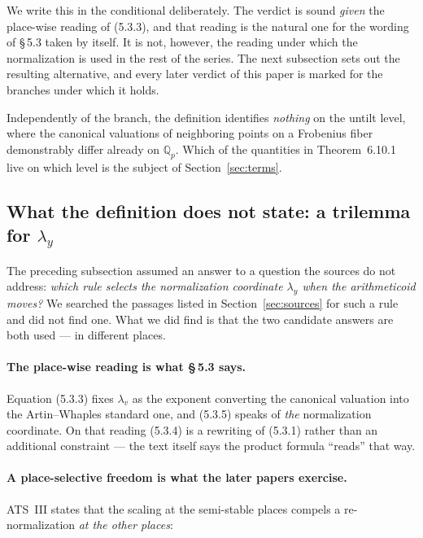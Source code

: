 \documentclass[11pt,a4paper]{article}
\theoremstyle{definition}
\theoremstyle{plain}
\theoremstyle{definition}
\begin{document}
We write this in the conditional deliberately. The verdict is sound \emph{given}
the place-wise reading of (5.3.3), and that reading is the natural one for the
wording of \S\,5.3 taken by itself. It is not, however, the reading under which
the normalization is used in the rest of the series. The next subsection sets out
the resulting alternative, and every later verdict of this paper is marked for the
branches under which it holds.

Independently of the branch, the definition identifies \emph{nothing} on the
untilt level, where the canonical valuations of neighboring points on a Frobenius
fiber demonstrably differ already on $\mathbb{Q}_p$. Which of the quantities in
Theorem~6.10.1 live on which level is the subject of Section~\ref{sec:terms}.

\subsection{What the definition does not state: a trilemma for
\texorpdfstring{$\lambda_y$}{lambda\_y}}
\label{sec:trilemma}

The preceding subsection assumed an answer to a question the sources do not
address: \emph{which rule selects the normalization coordinate $\lambda_y$ when
the arithmeticoid moves?} We searched the passages listed in
Section~\ref{sec:sources} for such a rule and did not find one. What we did find
is that the two candidate answers are both used --- in different places.

\paragraph{The place-wise reading is what \S\,5.3 says.}
Equation (5.3.3) fixes $\lambda_v$ as the exponent converting the canonical
valuation into the Artin--Whaples standard one, and (5.3.5) speaks of
\emph{the} normalization coordinate. On that reading (5.3.4) is a rewriting of
(5.3.1) rather than an additional constraint --- the text itself says the product
formula ``reads'' that way.

\paragraph{A place-selective freedom is what the later papers exercise.}
ATS~III states that the scaling at the semi-stable places compels a
re-normalization \emph{at the other places}:
\end{document}
